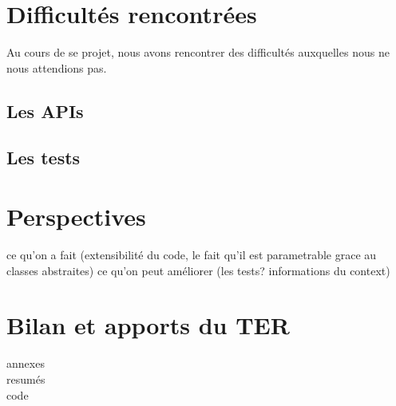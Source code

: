 \documentclass[12pt,a4paper]{report}
\theoremstyle{definition}
\begin{document}
	\section{Difficultés rencontrées}
	Au cours de se projet, nous avons rencontrer des difficultés auxquelles nous ne nous attendions pas.
	\subsection{Les APIs}
	\subsection{Les tests}

	\section{Perspectives}
	ce qu'on a fait (extensibilité du code, le fait qu'il est parametrable grace au classes abstraites)
	ce qu'on peut améliorer (les tests? informations du context)
	\section{Bilan et apports du TER}
annexes\\
resumés\\
code



\end{document}
